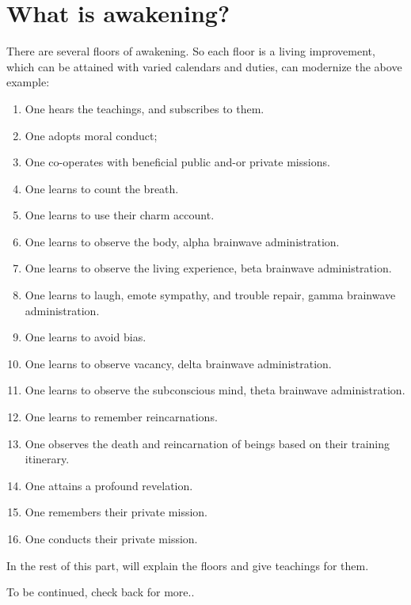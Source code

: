\chapter{What is awakening?}
There are several floors of awakening. So each floor is a living improvement,
which can be attained with varied calendars and duties,
can modernize the above example:
\begin{enumerate}
  \item  One hears the teachings, and subscribes to them.
  \item  One adopts moral conduct;
  \item  One co-operates with beneficial public and-or private missions.
  \item  One learns to count the breath.
  \item  One learns to use their charm account.
  \item  One learns to observe the body, alpha brainwave administration.
  \item  One learns to observe the living experience, beta brainwave
administration.
  \item  One learns to laugh, emote sympathy, and trouble repair, gamma
brainwave administration.
  \item  One learns to avoid bias.
  \item  One learns to observe vacancy, delta brainwave administration.
  \item  One learns to observe the subconscious mind, theta brainwave
administration.
  \item  One learns to remember reincarnations.
  \item  One observes the death and reincarnation of beings based on their
training itinerary.
  \item  One attains a profound revelation.
  \item  One remembers their private mission.
  \item  One conducts their private mission.
\end{enumerate}

In the rest of this part, will explain the floors and give teachings for them.

To be continued, check back for more..
